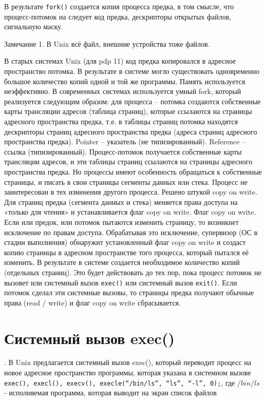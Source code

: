 В результате \verb|fork()| создается копия процесса предка, в том смысле, что процесс-потомок на следует код предка, дескрипторы открытых файлов, сигнальную маску.

Замечание 1. В Unix всё файл, внешние устройства тоже файлов.

В старых системах Unix (для pdp 11) код предка копировался в адресное пространство потомка. В результате в системе могло существовать одновременно большое количество копий одной и той же программы.  Память используется неэффективно. В современных системах используется умный fork, который реализуется следующим образом: для процесса – потомка создаются собственные карты трансляции адресов (таблица страниц), которые ссылаются на страницы адресного пространства предка, т.е. в таблицы страниц потомка находятся дескрипторы страниц адресного пространства предка (адреса страниц адресного пространства предка). Pointer – указатель (не типизированный). Reference – ссылка (типизированный). Процесс-потомок получается собственные карты трансляции адресов, и эти таблицы страниц ссылаются на страницы адресного пространства предка. Но процессы имеют особенность обращаться к собственные страницы, и писать в свои страницы сегменты данных или стека. Процесс не заинтересован в тех изменения другого процесса. Решено штукой copy on write. Для страниц предка (сегмента данных и стека) меняется права доступа на «только для чтения» и устанавливается флаг copy on write. Флаг copy on write. Если или предок, или потомок пытаются изменить страницу, то возникнет исключение по правам доступа. Обрабатывая это исключение, супервизор (ОС в стадии выполнения) обнаружит установленный флаг copy on write и создаст копию страницы в адресном пространстве того процесса, который пытался её изменить. В результате в системе создается необходимое количество копий (отдельных страниц). Это будет действовать до тех пор, пока процесс потомок не вызовет или системный вызов \verb|exec()| или системный вызов \verb|exit()|. Если потомок сделал эти системные вызовы, то страницы предка получают обычные права (read / write) и флаг copy on write сбрасывается. 

\section{Системный вызов exec()}.
В Unix предлагается системный вызов exec(), который переводит процесс на новое адресное пространство программы, которая указана в системном вызове \verb|exec(), execl(), execv(), execle(“/bin/ls”, “ls”, “-l”, 0);|, где
$/bin/ls$ - исполняемая программа, которая выводит на экран список файлов

